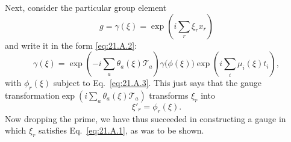 Next, consider the particular group element
\begin{equation}
 g=\gamma(\xi)=\exp\left(i\sum_r\xi_rx_r\right)
 \tag{21.A.9}\label{eq:21.A.9}
\end{equation}
and write it in the form \eqref{eq:21.A.2}:
\begin{equation}
 \gamma(\xi)
 =\exp\left(-i\sum_a\theta_a(\xi)\mathcal T_a\right)
 \gamma\bigl(\phi(\xi)\bigr)
 \exp\left(i\sum_i\mu_i(\xi)t_i\right),
 \tag{21.A.10}\label{eq:21.A.10}
\end{equation}
with $\phi_r(\xi)$ subject to Eq.~\eqref{eq:21.A.3}. This just says that the
gauge transformation\linebreak[4]
$\exp\left(i\sum_a\theta_a(\xi)\mathcal T_a\right)$
transforms $\xi_r$ into
\begin{equation}
 \xi'_r=\phi_r(\xi).
 \tag{21.A.11}\label{eq:21.A.11}
\end{equation}
Now dropping the prime, we have thus succeeded in constructing a gauge in
which $\xi_r$ satisfies Eq.~\eqref{eq:21.A.1}, as was to be shown.
